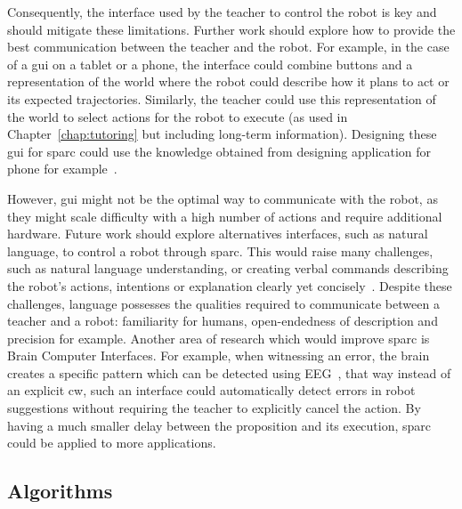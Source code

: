 Consequently, the interface used by the teacher to control the robot is key and should mitigate these limitations. Further work should explore how to provide the best communication between the teacher and the robot. For example, in the case of a \gls{gui} on a tablet or a phone, the interface could combine buttons and a representation of the world where the robot could describe how it plans to act or its expected trajectories. Similarly, the teacher could use this representation of the world to select actions for the robot to execute (as used in Chapter~\ref{chap:tutoring} but including long-term information). Designing these \gls{gui} for \gls{sparc} could use the knowledge obtained from designing application for phone for example~\citep{joorabchi2013real}. 

However, \gls{gui} might not be the optimal way to communicate with the robot, as they might scale difficulty with a high number of actions and require additional hardware. Future work should explore alternatives interfaces, such as natural language, to control a robot through \gls{sparc}. This would raise many challenges, such as natural language understanding, or creating verbal commands describing the robot's actions, intentions or explanation clearly yet concisely~\citep{hayes2017improving}. Despite these challenges, language possesses the qualities required to communicate between a teacher and a robot: familiarity for humans, open-endedness of description and precision for example. Another area of research which would improve \gls{sparc} is Brain Computer Interfaces. For example, when witnessing an error, the brain creates a specific pattern which can be detected using EEG~\citep{gehring1993neural}, that way instead of an explicit \gls{cw}, such an interface could automatically detect errors in robot suggestions without requiring the teacher to explicitly cancel the action. By having a much smaller delay between the proposition and its execution, \gls{sparc} could be applied to more applications.

\subsection{Algorithms}

